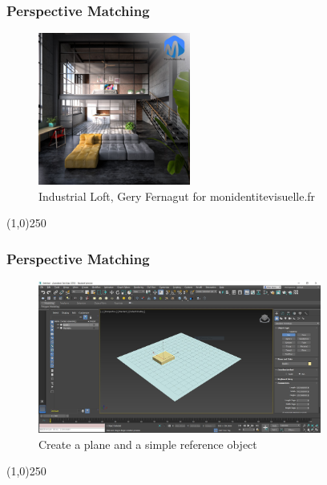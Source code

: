 \begin{frame}
	\frametitle{Perspective Matching}
	\begin{figure}
		\centering
		\includegraphics[height=5cm]{./img/PerspectiveMatching/loft_large.jpg}
		\caption[Industrial Loft, Gery Fernagut for monidentitevisuelle.fr]{Industrial Loft, Gery Fernagut for monidentitevisuelle.fr}
		\label{fig:loftlarge}
	\end{figure}
	
\end{frame}
\begin{center}\line(1,0){250}\end{center}



\begin{frame}
	\frametitle{Perspective Matching}
	\begin{figure}
		\centering
		\includegraphics[height=5cm]{./img/PerspectiveMatching/1.jpg}
		\caption[Create a plane and a simple reference object]{Create a plane and a simple reference object}
		\label{fig:PerspectiveMatch1}
	\end{figure}
\end{frame}
\begin{center}\line(1,0){250}\end{center}



